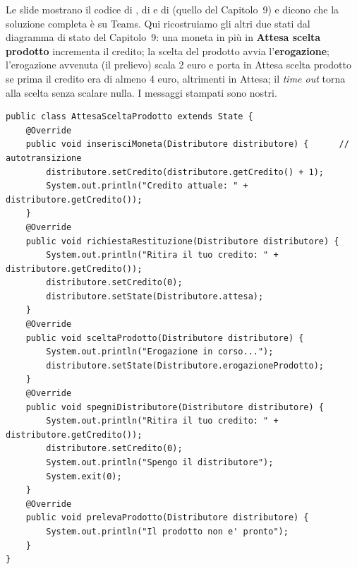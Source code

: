 Le slide mostrano il codice di , di  e di  (quello del Capitolo~9) e dicono che
la soluzione completa è su Teams. Qui ricostruiamo gli altri due stati dal diagramma di stato del Capitolo~9: una moneta in
più in \textbf{Attesa scelta prodotto} incrementa il credito; la scelta del prodotto avvia l'\textbf{erogazione};
l'erogazione avvenuta (il prelievo) scala 2 euro e porta in Attesa scelta prodotto se prima il credito era di almeno 4 euro,
altrimenti in Attesa; il \textit{time out} torna alla scelta senza scalare nulla. I messaggi stampati sono nostri.

\begin{lstlisting}[style=java, name=AttesaSceltaProdotto.java]
public class AttesaSceltaProdotto extends State {
    @Override
    public void inserisciMoneta(Distributore distributore) {      // autotransizione
        distributore.setCredito(distributore.getCredito() + 1);
        System.out.println("Credito attuale: " + distributore.getCredito());
    }
    @Override
    public void richiestaRestituzione(Distributore distributore) {
        System.out.println("Ritira il tuo credito: " + distributore.getCredito());
        distributore.setCredito(0);
        distributore.setState(Distributore.attesa);
    }
    @Override
    public void sceltaProdotto(Distributore distributore) {
        System.out.println("Erogazione in corso...");
        distributore.setState(Distributore.erogazioneProdotto);
    }
    @Override
    public void spegniDistributore(Distributore distributore) {
        System.out.println("Ritira il tuo credito: " + distributore.getCredito());
        distributore.setCredito(0);
        System.out.println("Spengo il distributore");
        System.exit(0);
    }
    @Override
    public void prelevaProdotto(Distributore distributore) {
        System.out.println("Il prodotto non e' pronto");
    }
}
\end{lstlisting}

